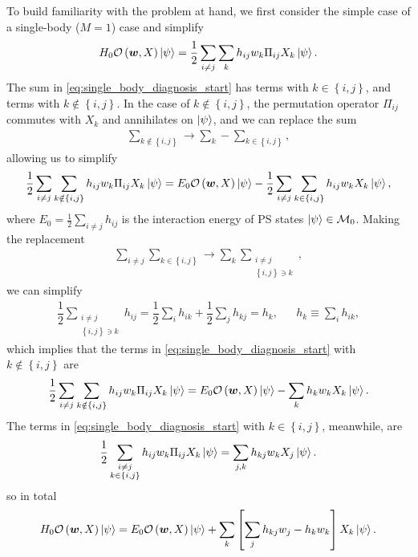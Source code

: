 \documentclass[nofootinbib,notitlepage,11pt]{revtex4-2}
\newcommand{\f}[2]{\dfrac{#1}{#2}} %
\newcommand{\p}[1]{\left(#1\right)} %
\renewcommand{\sp}[1]{\left[#1\right]} %
\renewcommand{\set}[1]{\left\{#1\right\}} %
\newcommand{\m}{\bm} %
\newcommand{\1}{\mathds{1}}
\newcommand{\M}{\mathcal{M}}
\renewcommand{\O}{\mathcal{O}}
\begin{document}
To build familiarity with the problem at hand, we first consider the
simple case of a single-body ($M=1$) case and simplify
\begin{align}
  H_0 \O\p{\m w,X} \ket\psi
  = \f12 \sum_{i\ne j} \sum_k h_{ij} w_k \Pi_{ij} X_k \ket\psi.
  \label{eq:single_body_diagnosis_start}
\end{align}
The sum in \eqref{eq:single_body_diagnosis_start} has terms with
$k\in\set{i,j}$, and terms with $k\notin\set{i,j}$.  In the case of
$k\notin\set{i,j}$, the permutation operator $\Pi_{ij}$ commutes with
$X_k$ and annihilates on $\ket\psi$, and we can replace the sum
\begin{align}
  \sum_{k\notin\set{i,j}} \to \sum_k - \sum_{k\in\set{i,j}},
\end{align}
allowing us to simplify
\begin{align}
  \f12 \sum_{i\ne j} \sum_{k\notin\set{i,j}}
  h_{ij} w_k \Pi_{ij} X_k \ket\psi
  = E_0 \O\p{\m w,X} \ket\psi
  - \f12 \sum_{i\ne j} \sum_{k\in\set{i,j}} h_{ij} w_k X_k \ket\psi,
\end{align}
where $E_0=\frac12\sum_{i\ne j}h_{ij}$ is the interaction energy of PS
states $\ket\psi\in\M_0$.  Making the replacement
\begin{align}
  \sum_{i\ne j} \sum_{k\in\set{i,j}}
  \to \sum_k \sum_{\substack{i\ne j\\\set{i,j}\ni k}},
\end{align}
we can simplify
\begin{align}
  \f12 \sum_{\substack{i\ne j\\\set{i,j}\ni k}} h_{ij}
  = \f12 \sum_i h_{ik} + \f12 \sum_j h_{kj}
  = h_k,
  &&
  h_k \equiv \sum_i h_{ik},
\end{align}
which implies that the terms in \eqref{eq:single_body_diagnosis_start}
with $k\notin\set{i,j}$ are
\begin{align}
  \f12 \sum_{i\ne j} \sum_{k\notin\set{i,j}}
  h_{ij} w_k \Pi_{ij} X_k \ket\psi
  = E_0 \O\p{\m w,X} \ket\psi - \sum_k h_k w_k X_k \ket\psi.
\end{align}
The terms in \eqref{eq:single_body_diagnosis_start} with
$k\in\set{i,j}$, meanwhile, are
\begin{align}
  \f12 \sum_{\substack{i\ne j\\k\in\set{i,j}}}
  h_{ij} w_k \Pi_{ij} X_k \ket\psi
  = \sum_{j,k} h_{kj} w_k X_j \ket\psi.
\end{align}
so in total
\begin{align}
  H_0 \O\p{\m w,X} \ket\psi
  = E_0 \O\p{\m w,X} \ket\psi
  + \sum_k \sp{\sum_j h_{kj} w_j - h_k w_k} X_k \ket\psi.
  \label{eq:single_body_diagnosis_end}
\end{align}
\end{document}

